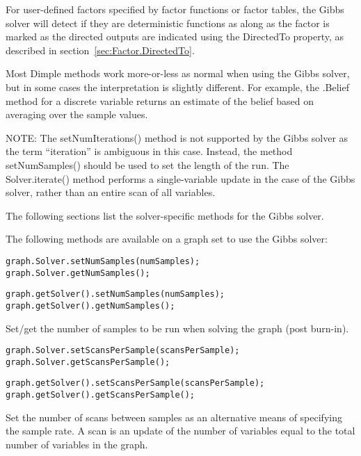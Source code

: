\ifjava
For user-defined factors specified by factor functions or factor tables, the Gibbs solver will detect if they are deterministic functions as along as the factor is marked as the directed outputs are indicated using the DirectedTo property, as described in section~\ref{sec:Factor.DirectedTo}.
\fi
 


Most Dimple methods work more-or-less as normal when using the Gibbs solver, but in some cases the interpretation is slightly different. For example, the .Belief method for a discrete variable returns an estimate of the belief based on averaging over the sample values.

NOTE: The setNumIterations() method is not supported by the Gibbs solver as the term ``iteration'' is ambiguous in this case. Instead, the method setNumSamples() should be used to set the length of the run. The Solver.iterate() method performs a single-variable update in the case of the Gibbs solver, rather than an entire scan of all variables.

The following sections list the solver-specific methods for the Gibbs solver.


The following methods are available on a graph set to use the Gibbs solver:

\ifmatlab
\begin{lstlisting}
graph.Solver.setNumSamples(numSamples);
graph.Solver.getNumSamples();
\end{lstlisting}
\fi

\ifjava
\begin{lstlisting}
graph.getSolver().setNumSamples(numSamples);
graph.getSolver().getNumSamples();
\end{lstlisting}
\fi

Set/get the number of samples to be run when solving the graph (post burn-in).

\ifmatlab
\begin{lstlisting}
graph.Solver.setScansPerSample(scansPerSample);
graph.Solver.getScansPerSample();
\end{lstlisting}
\fi

\ifjava
\begin{lstlisting}
graph.getSolver().setScansPerSample(scansPerSample);
graph.getSolver().getScansPerSample();
\end{lstlisting}
\fi

Set the number of scans between samples as an alternative means of specifying the sample rate. A scan is an update of the number of variables equal to the total number of variables in the graph.


